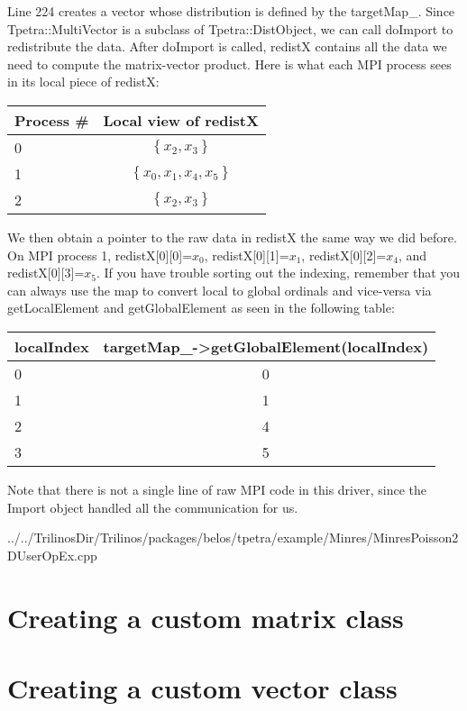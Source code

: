 \documentclass[pdf,12pt,report,strict]{SANDreport}
\begin{document}
Line 224 creates a vector whose distribution is defined by the
targetMap\_.  Since Tpetra::MultiVector is a subclass of Tpetra::DistObject, we
can call doImport to redistribute the data.  After doImport is called, redistX
contains all the data we need to compute the matrix-vector product.  Here is
what each MPI process sees in its local piece of redistX:

\begin{center}
\begin{tabular}{|l|c|}
\hline
Process \# & Local view of redistX \\
\hline \hline
0 & $\left\{x_2,x_3\right\}$ \\
1 & $\left\{x_0,x_1,x_4,x_5\right\}$ \\
2 & $\left\{x_2,x_3\right\}$ \\
\hline
\end{tabular}
\end{center}

We then obtain a pointer to the raw data in redistX the same way we did before.
On MPI process 1, redistX[0][0]=$x_0$, redistX[0][1]=$x_1$, redistX[0][2]=$x_4$,
and redistX[0][3]=$x_5$.  If you have trouble sorting out the indexing, remember
that you can always use the map to convert local to global ordinals and
vice-versa via getLocalElement and getGlobalElement as seen in the following
table:

\begin{center}
\begin{tabular}{|l|c|}
\hline
localIndex & targetMap\_->getGlobalElement(localIndex) \\
\hline \hline
0 & 0 \\
1 & 1 \\
2 & 4 \\
3 & 5 \\
\hline
\end{tabular}
\end{center}

Note that there is not a single line of raw MPI code in this driver, since the
Import object handled all the communication for us.

\begin{lstinputlisting}[caption=MinresPoisson2DUserOpEx.cpp,
label=laplace2DCode]{../../TrilinosDir/Trilinos/packages/belos/tpetra/example/Minres/MinresPoisson2DUserOpEx.cpp}
\end{lstinputlisting}

\chapter{Creating a custom matrix class}

\chapter{Creating a custom vector class}
\end{document}
